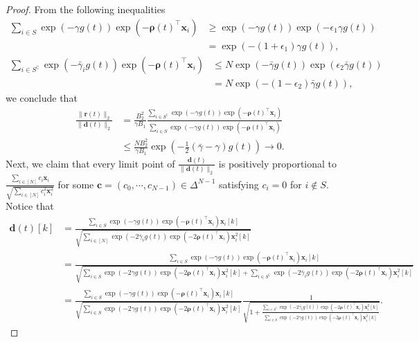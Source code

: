 \documentclass{article} %
\theoremstyle{plain}
\theoremstyle{definition}
\theoremstyle{remark}
\def\bc{{\mathbf c}}
\def\bd{{\mathbf d}}
\begin{document}
\begin{proof}
    From the following inequalities
    \begin{align*}
        \sum_{i \in S} \exp(-\gamma g(t))\exp(-\boldsymbol{\rho}(t)^\top \mathbf{x}_i)
        &\geq \exp(-\gamma g(t)) \exp(-\epsilon_1 \gamma g(t)) \\
        &= \exp(-(1+\epsilon_1)\gamma g(t)),
    \end{align*}
    \begin{align*}
        \sum_{i \in S^\complement}\exp(-\bar{\gamma}_i g(t))\exp(-\boldsymbol{\rho}(t)^\top \mathbf{x}_i)&\leq N\exp(-\bar{\gamma}g(t))\exp(\epsilon_2 \bar{\gamma} g(t)) \\
        &= N\exp(-(1-\epsilon_2)\bar{\gamma}g(t)),
    \end{align*}
    we conclude that
    \begin{align*}
        \frac{\|\mathbf{r}(t)\|_2}{\|\mathbf{d}(t)\|_2} &= \frac{B_2^2}{\gamma B_1}\frac{\sum_{i \in S^\complement} \exp(-\gamma g(t))\exp(-\boldsymbol{\rho}(t)^\top \mathbf{x}_i)}{\sum_{i \in S} \exp(-\gamma g(t))\exp(-\boldsymbol{\rho}(t)^\top \mathbf{x}_i)} \\
        &\leq \frac{NB_2^2}{\gamma B_1}\exp(-\frac{1}{2}(\bar{\gamma}-\gamma)g(t)) \rightarrow 0.
    \end{align*}
    Next, we claim that every limit point of $\frac{\bd(t)}{\|\bd(t)\|_2}$ is positively proportional to $\frac{\sum_{i \in [N]}c_i \mathbf{x}_i}{\sqrt{\sum_{i \in [N]}c_i^2 \mathbf{x}_i^2}}$ for some $\bc=(c_0, \cdots, c_{N-1}) \in \Delta^{N-1}$ satisfying $c_i=0$ for $i \notin S$. Notice that
    \begin{align*}
        \mathbf{d}(t)[k] &= \frac{\sum_{i \in S} \exp(-\gamma g(t))\exp(-\boldsymbol{\rho}(t)^\top \mathbf{x}_i) \mathbf{x}_i[k]}{\sqrt{\sum_{i \in [N]}\exp(-2\bar{\gamma}_i g(t))\exp(-2\boldsymbol{\rho}(t)^\top \mathbf{x}_i) \mathbf{x}_i^2[k]}} \\
        &= \frac{\sum_{i \in S} \exp(-\gamma g(t))\exp(-\boldsymbol{\rho}(t)^\top \mathbf{x}_i) \mathbf{x}_i[k]}{\sqrt{\sum_{i \in S}\exp(-2\gamma g(t))\exp(-2\boldsymbol{\rho}(t)^\top \mathbf{x}_i) \mathbf{x}_i^2[k]+\sum_{i \in S^\complement}\exp(-2\bar{\gamma}_i g(t))\exp(-2\boldsymbol{\rho}(t)^\top \mathbf{x}_i) \mathbf{x}_i^2[k]}}\\
        &=\frac{\sum_{i \in S} \exp(-\gamma g(t))\exp(-\boldsymbol{\rho}(t)^\top \mathbf{x}_i) \mathbf{x}_i[k]}{\sqrt{\sum_{i \in S}\exp(-2\gamma g(t))\exp(-2\boldsymbol{\rho}(t)^\top \mathbf{x}_i) \mathbf{x}_i^2[k]}} \frac{1}{\sqrt{1+\frac{\sum_{i \in S^\complement}\exp(-2\bar{\gamma}_i g(t))\exp(-2\boldsymbol{\rho}(t)^\top \mathbf{x}_i) \mathbf{x}_i^2[k]}{\sum_{i \in S}\exp(-2\gamma g(t))\exp(-2\boldsymbol{\rho}(t)^\top \mathbf{x}_i) \mathbf{x}_i^2[k]}}}.

\end{align*}
\end{proof}
\end{document}
